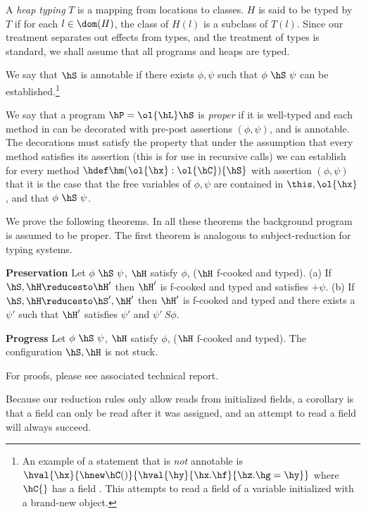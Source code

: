 A {\em heap typing} $T$ is a mapping from locations to classes. $H$ is
said to be typed by $T$ if for each $l\in\dom(H)$, the class of $H(l)$
is a subclass of $T(l)$.  Since our treatment separates out effects
from types, and the treatment of types is standard, we shall assume
that all programs and heaps are typed.

We say that $\hS$ is annotable if there exists $\phi,\psi$ such that
$\phi~\hS~\psi$ can be established.\footnote{An example of a statement that is
{\em not} annotable is $\hval{\hx}{\hnew
  \hC()}{\hval{\hy}{\hx.\hf}{\hz.\hg=\hy}}$ where $\hC{}$ has a field
\hf. This attempts to read a field of a variable initialized with a
brand-new object.}

We say that a program $\hP=\ol{\hL}\hS$ is {\em proper} if it is
well-typed and each method in \hL{} can be decorated with pre-post assertions
$(\phi,\psi)$, and \hS is annotable.
The decorations must satisfy the property that under the
assumption that every method satisfies its assertion (this is for use
in recursive calls) we can establish for every method
$\hdef\hm(\ol{\hx}:\ol{\hC})\{\hS\}$ with assertion $(\phi,\psi)$ that
it is the case that the free variables of $\phi,\psi$ are contained in
$\this,\ol{\hx}$, and that $\phi~\hS~\psi$.

We prove the following theorems. In all these theorems the background
program \hP{} is assumed to be proper. The first theorem is analogous
to subject-reduction for typing systems.
\begin{Theorem}{\textbf{Preservation}}
Let $\phi~\hS~\psi$, $\hH$ satisfy $\phi$, ($\hH$ f-cooked and typed).
(a) If $\hS,\hH \reducesto \hH'$ then $\hH'$ is f-cooked and typed and satisfies $+\psi$.
(b) If $\hS,\hH \reducesto \hS',\hH'$ then $\hH'$ is f-cooked and typed and
there exists a $\psi'$ such
that $\hH'$ satisfies $\psi'$ and $\psi'~S\phi$.
\end{Theorem}

\begin{Theorem}{\textbf{Progress}}
 Let $\phi~\hS~\psi$, $\hH$ satisfy $\phi$, ($\hH$ f-cooked and
 typed). The configuration $\hS,\hH$ is not stuck.
\end{Theorem}

For proofs, please see associated technical report.

Because our reduction rules only allow reads from initialized fields,
a corollary is that a field can only be read after it was assigned,
and an attempt to read a field will always succeed.
